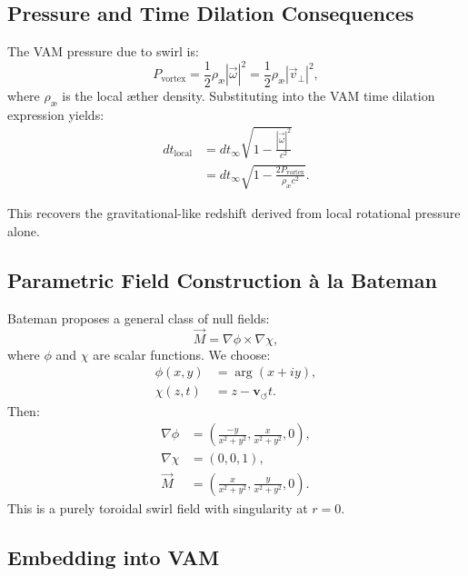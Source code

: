 \subsection{Pressure and Time Dilation Consequences}

The VAM pressure due to swirl is:\cite{iskandarani2025swirlgravity}
\begin{equation}
    P_\text{vortex} = \frac{1}{2} \rho_\text{\ae} |\vec{\omega}|^2 = \frac{1}{2} \rho_\text{\ae} |\vec{v}_\perp|^2,
\end{equation}
where $\rho_\text{\ae}$ is the local æther density. Substituting into the VAM time dilation expression yields:
\begin{align}
    dt_\text{local} &= dt_\infty \sqrt{1 - \frac{|\vec{\omega}|^2}{c^2}} \\
    &= dt_\infty \sqrt{1 - \frac{2P_\text{vortex}}{\rho_\text{\ae} c^2}}. \label{eq:bateman_vam_dilation}
\end{align}

This recovers the gravitational-like redshift derived from local rotational pressure alone.

\subsection*{Parametric Field Construction \`a la Bateman}

Bateman proposes a general class of null fields:\cite{bateman1915aether}
\begin{equation}
    \vec{M} = \nabla \phi \times \nabla \chi, \label{eq:bateman_crossgrad}
\end{equation}
where $\phi$ and $\chi$ are scalar functions. We choose:
\begin{align}
    \phi(x,y) &= \arg(x + i y), \\
    \chi(z,t) &= z - \mathbf{v}_{\scriptscriptstyle\boldsymbol{\circlearrowleft}} t.
\end{align}
Then:
\begin{align}
    \nabla \phi &= \left(\frac{-y}{x^2 + y^2}, \frac{x}{x^2 + y^2}, 0\right), \\
    \nabla \chi &= (0, 0, 1), \\
    \vec{M} &= \left(\frac{x}{x^2 + y^2}, \frac{y}{x^2 + y^2}, 0\right).
\end{align}
This is a purely toroidal swirl field with singularity at $r=0$.

\subsection{Embedding into VAM}

